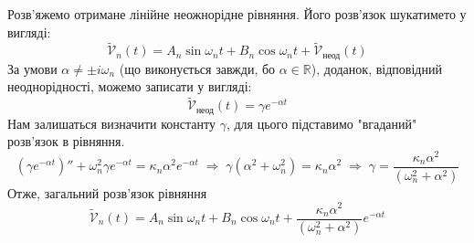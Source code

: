 Розв'яжемо отримане лінійне неожнорідне рівняння. Його розв'язок шукатимето у вигляді:
\begin{equation}
    \widetilde{\mathcal{V}}_n(t) = A_n \sin\omega_nt + B_n \cos\omega_nt + \widetilde{\mathcal{V}}_{\text{неод}}(t)
\end{equation}
За умови $\alpha \neq \pm i\omega_n$ (що виконується завжди, бо $\alpha \in \mathbb{R}$), доданок, відповідний неоднорідності, можемо записати у вигляді: 
\[\widetilde{\mathcal{V}}_{\text{неод}}(t) = \gamma e^{-\alpha t}\]
Нам залишаться визначити константу $\gamma$, для цього підставимо "вгаданий"\\ розв'язок в рівняння. 
\begin{equation*}
    (\gamma e^{-\alpha t})'' + \omega_n^2 \gamma e^{-\alpha t} = \kappa_n\alpha^2 e^{-\alpha t}
    \;\Rightarrow\;
    \gamma(\alpha^2 + \omega_n^2) = \kappa_n\alpha^2
    \;\Rightarrow\;
    \gamma = \frac{\kappa_n\alpha^2}{(\omega_n^2 + \alpha^2)}
\end{equation*}
Отже, загальний розв'язок рівняння 
\begin{equation} \label{gen-time-sol7,1}
    \widetilde{\mathcal{V}}_n(t) = A_n \sin\omega_nt + B_n \cos\omega_nt + \frac{\kappa_n\alpha^2}{(\omega_n^2 + \alpha^2)} e^{-\alpha t}
\end{equation}  

